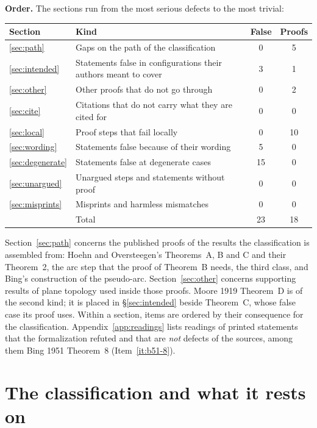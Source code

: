 \documentclass[11pt]{article}
\newcounter{defect}
\begin{document}
\textbf{Order.} The sections run from the most serious defects to the most trivial:
\begin{center}
\begin{tabular}{@{}llcc@{}}
\toprule
Section & Kind & False & Proofs \\
\midrule
\ref{sec:path} & Gaps on the path of the classification & 0 & 5\\
\ref{sec:intended} & Statements false in configurations their authors meant to cover & 3 & 1\\
\ref{sec:other} & Other proofs that do not go through & 0 & 2\\
\ref{sec:cite} & Citations that do not carry what they are cited for & 0 & 0\\
\ref{sec:local} & Proof steps that fail locally & 0 & 10\\
\ref{sec:wording} & Statements false because of their wording & 5 & 0\\
\ref{sec:degenerate} & Statements false at degenerate cases & 15 & 0\\
\ref{sec:unargued} & Unargued steps and statements without proof & 0 & 0\\
\ref{sec:misprints} & Misprints and harmless mismatches & 0 & 0\\
\midrule
 & Total & 23 & 18\\
\bottomrule
\end{tabular}
\end{center}
Section~\ref{sec:path} concerns the published proofs of the results the classification is
assembled from: Hoehn and Oversteegen's Theorems~A, B and C and their Theorem~2, the arc step that
the proof of Theorem~B needs, the third class, and Bing's construction of the pseudo-arc.
Section~\ref{sec:other} concerns supporting results of plane topology used inside those proofs.
Moore 1919 Theorem~D is of the second kind; it is placed in \S\ref{sec:intended} beside Theorem~C,
whose false case its proof uses. Within a section, items are ordered by their consequence for the
classification. Appendix~\ref{app:readings} lists readings of printed statements that the
formalization refuted and that are \emph{not} defects of the sources, among them Bing 1951
Theorem~8 (Item~\ref{it:b51-8}).

\section{The classification and what it rests on}\label{sec:classification}
\end{document}
